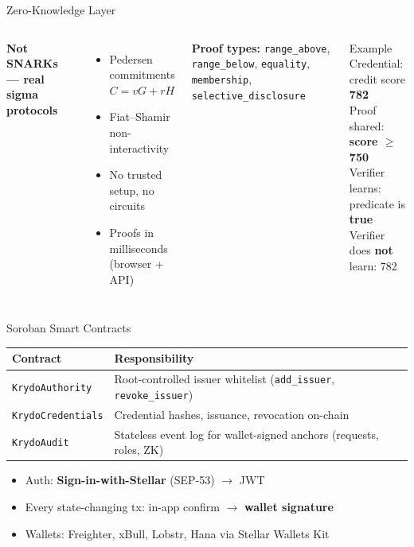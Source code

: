 \documentclass[aspectratio=169,11pt]{beamer}
\begin{document}
\begin{frame}{Zero-Knowledge Layer}
  \begin{columns}[T]
    \textbf{Not SNARKs --- real sigma protocols}
    \begin{itemize}
      \item Pedersen commitments $C = vG + rH$
      \item Fiat--Shamir non-interactivity
      \item No trusted setup, no circuits
      \item Proofs in milliseconds (browser + API)
    \end{itemize}
    \vspace{0.4em}
  \textbf{Proof types:}
    \texttt{range\_above}, \texttt{range\_below}, \texttt{equality}, \texttt{membership}, \texttt{selective\_disclosure}
    \begin{block}{Example}
      Credential: credit score \textbf{782}\\[0.3em]
      Proof shared: \textbf{score $\geq$ 750}\\[0.3em]
      Verifier learns: predicate is \textbf{true}\\[0.3em]
      Verifier does \textbf{not} learn: 782
    \end{block}
  \end{columns}
\end{frame}

\begin{frame}{Soroban Smart Contracts}
  \begin{table}
    \small
    \renewcommand{\arraystretch}{1.35}
    \begin{tabularx}{\textwidth}{@{}l X@{}}
      \toprule
      \textbf{Contract} & \textbf{Responsibility} \\
      \midrule
      \texttt{KrydoAuthority} & Root-controlled issuer whitelist (\texttt{add\_issuer}, \texttt{revoke\_issuer}) \\
      \texttt{KrydoCredentials} & Credential hashes, issuance, revocation on-chain \\
      \texttt{KrydoAudit} & Stateless event log for wallet-signed anchors (requests, roles, ZK) \\
      \bottomrule
    \end{tabularx}
  \end{table}
  \vspace{0.3em}
  \begin{itemize}
    \item Auth: \textbf{Sign-in-with-Stellar} (SEP-53) $\rightarrow$ JWT
    \item Every state-changing tx: in-app confirm $\rightarrow$ \textbf{wallet signature}
    \item Wallets: Freighter, xBull, Lobstr, Hana via Stellar Wallets Kit
  \end{itemize}
\end{frame}
\end{document}
